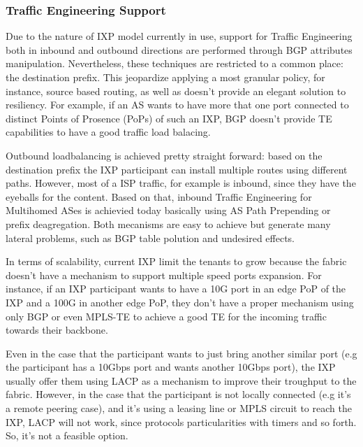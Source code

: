 \documentclass[conference]{IEEEtran/IEEEtran}
\begin{document}
\subsubsection{Traffic Engineering Support}
Due to the nature of IXP model currently in use, support for Traffic Engineering both in inbound and outbound directions are performed through BGP attributes manipulation. Nevertheless, these techniques are restricted to a common place: the destination prefix. This jeopardize applying a most granular policy, for instance, source based routing, as well as doesn't provide an elegant solution to resiliency. For example, if an AS wants to have more that one port connected to distinct Points of Prosence (PoPs) of such an IXP, BGP doesn't provide TE capabilities to have a good traffic load balacing.

Outbound loadbalancing is achieved pretty straight forward: based on the destination prefix the IXP participant can install multiple routes using different paths. However, most of a ISP traffic, for example is inbound, since they have the eyeballs for the content. Based on that, inbound Traffic Engineering for Multihomed ASes is achievied today basically using AS Path Prepending or prefix deagregation. Both mecanisms are easy to achieve but generate many lateral problems, such as BGP table polution and undesired effects.

In terms of scalability, current IXP limit the tenants to grow because the fabric doesn't have a mechanism to support multiple speed ports expansion. For instance, if an IXP participant wants to have a 10G port in an edge PoP of the IXP and a 100G in another edge PoP, they don't have a proper mechanism using only BGP or even MPLS-TE to achieve a good TE for the incoming traffic towards their backbone.

Even in the case that the participant wants to just bring another similar port (e.g the participant has a 10Gbps port and wants another 10Gbps port), the IXP usually offer them using LACP as a mechanism to improve their troughput to the fabric. However, in the case that the participant is not locally connected (e.g it's a remote peering case), and it's using a leasing line or MPLS circuit to reach the IXP, LACP will not work, since protocols particularities with timers and so forth. So, it's not a feasible option.

\end{document}
